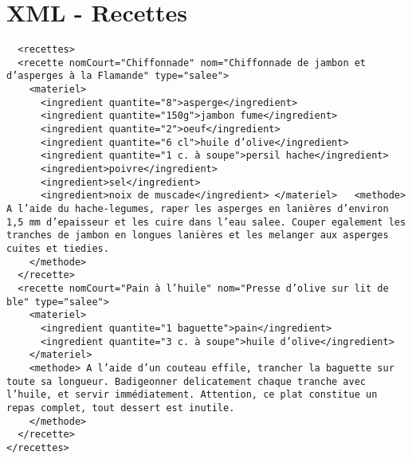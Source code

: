 \chapter{XML - Recettes}
\begin{verbatim}
  <recettes>
  <recette nomCourt="Chiffonnade" nom="Chiffonnade de jambon et d’asperges à la Flamande" type="salee">
    <materiel>
      <ingredient quantite="8">asperge</ingredient>
      <ingredient quantite="150g">jambon fume</ingredient>
      <ingredient quantite="2">oeuf</ingredient>
      <ingredient quantite="6 cl">huile d’olive</ingredient>
      <ingredient quantite="1 c. à soupe">persil hache</ingredient>
      <ingredient>poivre</ingredient>
      <ingredient>sel</ingredient>
      <ingredient>noix de muscade</ingredient> </materiel>   <methode> A l’aide du hache-legumes, raper les asperges en lanières d’environ 1,5 mm d’epaisseur et les cuire dans l’eau salee. Couper egalement les tranches de jambon en longues lanières et les melanger aux asperges cuites et tiedies.
    </methode>
  </recette>
  <recette nomCourt="Pain à l’huile" nom="Presse d’olive sur lit de ble" type="salee">
    <materiel>
      <ingredient quantite="1 baguette">pain</ingredient>
      <ingredient quantite="3 c. à soupe">huile d’olive</ingredient>
    </materiel>
    <methode> A l’aide d’un couteau effile, trancher la baguette sur toute sa longueur. Badigeonner delicatement chaque tranche avec l’huile, et servir immédiatement. Attention, ce plat constitue un repas complet, tout dessert est inutile.
    </methode>
  </recette>
</recettes>
\end{verbatim}